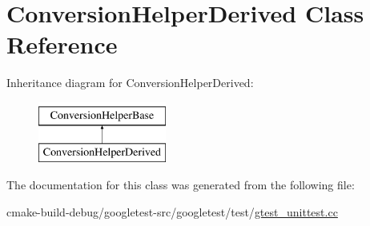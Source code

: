 \hypertarget{classConversionHelperDerived}{}\section{Conversion\+Helper\+Derived Class Reference}
\label{classConversionHelperDerived}
Inheritance diagram for Conversion\+Helper\+Derived\+:\begin{figure}[H]
\begin{center}
\leavevmode
\includegraphics[height=2.000000cm]{classConversionHelperDerived}
\end{center}
\end{figure}


The documentation for this class was generated from the following file\+:\begin{DoxyCompactItemize}
\item 
cmake-\/build-\/debug/googletest-\/src/googletest/test/\mbox{\hyperlink{gtest__unittest_8cc}{gtest\+\_\+unittest.\+cc}}\end{DoxyCompactItemize}
